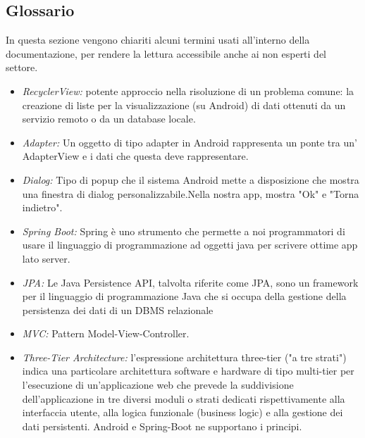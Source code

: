 \subsection{Glossario}
    \begin{flushleft}
        In questa sezione vengono chiariti alcuni termini usati all'interno della documentazione, per rendere la lettura accessibile
        anche ai non esperti del settore.
    \end{flushleft}

    \begin{itemize}
        \item \emph{RecyclerView:} potente approccio nella risoluzione di un problema comune: la creazione di liste per la visualizzazione (su Android) di dati ottenuti da un servizio remoto o da un database locale.
        \item \emph{Adapter:} Un oggetto di tipo adapter in Android rappresenta un ponte tra un' AdapterView e i dati che questa deve rappresentare.
        \item \emph{Dialog:} Tipo di popup che il sistema Android mette a disposizione che mostra una finestra di dialog personalizzabile.Nella nostra app, mostra "Ok" e "Torna indietro".
        \item \emph{Spring Boot:} Spring è uno strumento che permette a noi programmatori di usare il linguaggio di programmazione ad oggetti java per scrivere ottime app lato server.
        \item \emph{JPA:} Le Java Persistence API, talvolta riferite come JPA, sono un framework per il linguaggio di programmazione Java che si occupa della gestione della persistenza dei dati di un DBMS relazionale
        \item \emph{MVC:} Pattern Model-View-Controller.
        \item \emph{Three-Tier Architecture:} l'espressione architettura three-tier ("a tre strati") indica una particolare architettura software e hardware di tipo multi-tier per l'esecuzione di un'applicazione web che prevede la suddivisione dell'applicazione in tre diversi 
        moduli o strati dedicati rispettivamente alla interfaccia utente, alla logica funzionale (business logic) e alla gestione dei dati persistenti. Android e Spring-Boot ne supportano i principi.
    \end{itemize}
